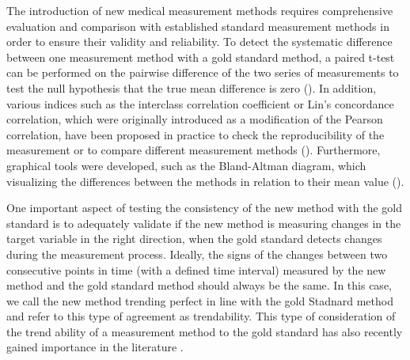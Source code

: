 
The introduction of new medical measurement methods requires comprehensive evaluation and comparison with established standard measurement methods in order to ensure their validity and reliability. 
To detect the systematic difference between one measurement method with a gold standard method, a paired t-test can be performed on the pairwise difference of the two series of measurements to test the null hypothesis that the true mean difference is zero (\cite{watson2010method}).
In addition, various indices such as the interclass correlation coefficient or Lin's concordance correlation, which were originally introduced as a modification of the Pearson correlation, have been proposed in practice to check the reproducibility of the measurement or to compare different measurement methods (\cite{lawrence1989concordance,koo2016guideline}). 
Furthermore, graphical tools were developed, such as the Bland-Altman diagram, which visualizing the differences between the methods in relation to their mean value (\cite{bland1986statistical}).

One important aspect of testing the consistency of the new method with the gold standard is to adequately validate if the new method is measuring changes in the target variable in the right direction, when the gold standard detects changes during the measurement process. 
Ideally, the signs of the changes between two consecutive points in time (with a defined time interval) measured by the new method and the gold standard method should always be the same. 
In this case, we call the new method trending perfect in line with the gold Stadnard method and refer to this type of agreement as trendability. 
This type of consideration of the trend ability of a measurement method to the gold standard has also recently gained importance in the literature \cite{saugel2015tracking, saugel2018error, hiraishi2021concordance}. 


